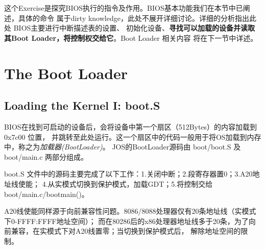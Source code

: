 \documentclass[12pt, letterpaper]{report}
\begin{document}

这个Exercise是探究BIOS执行的指令及作用。BIOS基本功能我们在本节中已阐述，具体的命令
属于dirty knowledge，此处不展开详细讨论。详细的分析指出此处 BIOS主要进行中断描述表的设置、
初始化设备、\textbf{寻找可以加载的设备并读取其Boot Loader，将控制权交给它}。Boot Loader 相关内容
将在下一节中详述。


\chapter[\Large The Boot Loader]{The Boot Loader}
\section[\large Loading the Kernel I: boot.S]{Loading the Kernel I: boot.S}
BIOS在找到可启动的设备后，会将设备中第一个扇区（512Bytes）的内容加载到 0x7c00 位置，
并跳转至此处运行。这一个扇区中的代码一般用于将OS加载到内存中，称之为\textsl{加载器(BootLoader)}。
JOS的BootLoader源码由 boot/boot.S 及 boot/main.c 两部分组成。 \par

boot.S 文件中的源码主要完成了以下工作：1.关闭中断；2.段寄存器置0；3.A20地址线使能；
4.从实模式切换到保护模式，加载GDT；5.将控制交给 boot/main.c/bootmain()。 \par

A20线使能同样源于向前兼容性问题。8086/8088处理器仅有20条地址线（实模式下0-FFFF:FFFF地址空间）；
而在80286后的x86处理器地址线多于20条，为了向前兼容，在实模式下对A20线置零；当切换到保护模式后，
解除地址空间的限制。\par 
\end{document}
